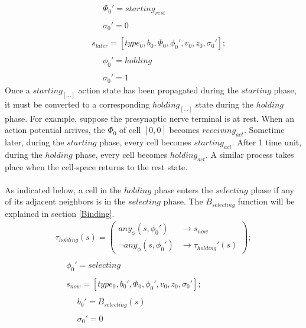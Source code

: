 \documentclass{acm_proc_article-sp}
\begin{document}
\begin{displaymath}
\begin{array}{l}
\\
\hspace{16pt} \hspace{16pt} \Phi_0' = starting_{rest} \\
\\
\hspace{16pt} \hspace{16pt} \sigma_0' = 0 \\
\\
\hspace{16pt} s_{later} = [type_0, b_0, \Phi_0, \phi_0', v_0, z_0, \sigma_0']; \\
\\
\hspace{16pt} \hspace{16pt} \phi_0' = holding \\
\\
\hspace{16pt} \hspace{16pt} \sigma_0' = 1 
\end{array} \end{displaymath}
Once a $starting_{[...]}$ action state has been propagated during the $starting$ 
phase, it must be converted to a corresponding $holding_{[...]}$ state during the
$holding$ phase. For example, suppose the presynaptic nerve terminal is at rest.  When an 
action potential arrives, the $\Phi_0$ of cell $[0,0]$ becomes $receiving_{act}$.
Sometime later, during the $starting$ phase, every cell becomes $starting_{act}$.  
After 1 time unit, during the $holding$ phase, every cell becomes $holding_{act}$.
A similar process takes place when the cell-space returns to the rest state. \\
\\
As indicated below, a cell in the $holding$ phase enters the $selecting$ phase
if any of its adjacent neighbors is in the $selecting$ phase.  The 
$B_{selecting}$ function will be explained in section \ref{Binding}.
\begin{displaymath} \begin{array}{l}
\tau_{holding}(s) = \left( \begin{array}{ll} any_\phi(s, \phi_0')      & \rightarrow s_{now} \\
                                             \neg any_\phi(s, \phi_0') & \rightarrow \tau_{holding}'(s) \end{array} \right); \\
\\
\hspace{16pt} \phi_0' = selecting \\
\\
\hspace{16pt} s_{now} = [type_0, b_0', \Phi_0, \phi_0', v_0, z_0, \sigma_0']; \\
\\
\hspace{16pt} \hspace{16pt} b_0' = B_{selecting}(s) \\
\\
\hspace{16pt} \hspace{16pt} \sigma_0' = 0
\end{array} \end{displaymath}
\end{document}
